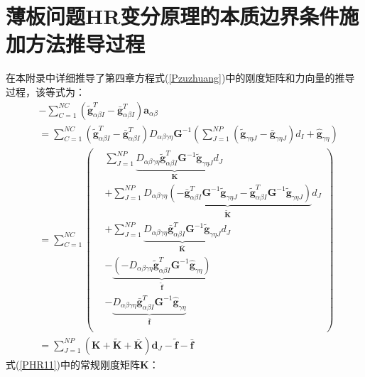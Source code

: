 \chapter{薄板问题HR变分原理的本质边界条件施加方法推导过程}\label{B}
在本附录中详细推导了第四章方程式(\ref{Pzuzhuang})中的刚度矩阵和力向量的推导过程，该等式为：
\begin{equation}
    \begin{split}
        &-\sum_{C=1}^{N\!C}(\tilde{\pmb g}_{\alpha\beta I}^T-\bar{\pmb g}_{\alpha\beta I}^T)\pmb a_{\alpha\beta}\\
        &=\sum_{C=1}^{N\!C}(\tilde{\pmb g}_{\alpha\beta I}^T-\bar{\pmb g}_{\alpha\beta I}^T)D_{\alpha\beta\gamma\eta}\pmb{G}^{-1}(\sum_{J=1}^{N\!P}(\tilde{\pmb g}_{\gamma\eta J}-\bar{\pmb g}_{\gamma\eta J})d_I+\hat{\pmb g}_{\gamma\eta})\\
        &=\sum_{C=1}^{N\!C}
        \left(\begin{split}
        &\sum_{J=1}^{N\!P}\underbrace{D_{\alpha\beta\gamma\eta}\tilde{\pmb g}_{\alpha\beta I}^T\pmb G^{-1}\tilde{\pmb g}_{\gamma\eta J}}_{\pmb{K}}d_J\\
        &+\sum_{J=1}^{N\!P}\underbrace{D_{\alpha\beta\gamma\eta}(-\bar{\pmb g}_{\alpha\beta I}^T\pmb G^{-1}\tilde{\pmb g}_{\gamma\eta J}-\tilde{\pmb g}_{\alpha\beta I}^T\pmb G^{-1}\tilde{\pmb g}_{\gamma\eta J})}_{\tilde{\pmb K}}d_J\\
        &+\sum_{J=1}^{N\!P}\underbrace{D_{\alpha\beta\gamma\eta}\bar{\pmb g}_{\alpha\beta I}^T\pmb G^{-1}\tilde{\pmb g}_{\gamma\eta J}}_{\bar{\pmb K}}d_J\\
        &-\underbrace{(-D_{\alpha\beta\gamma\eta}\tilde{\pmb g}_{\alpha\beta I}^T\pmb G^{-1}\hat{\pmb g}_{\gamma\eta })}_{\tilde{\pmb f}}\\
        &-\underbrace{D_{\alpha\beta\gamma\eta}\bar{\pmb g}_{\alpha\beta I}^T\pmb G^{-1}\hat{\pmb g}_{\gamma\eta }}_{\bar{\pmb f}}\\
        \end{split}\right)\\
        &=\sum_{J=1}^{N\!P}(\pmb{K}+\tilde{\pmb{K}}+\bar{\pmb{K}})\pmb d_J-\tilde{\pmb f}-\bar{\pmb f}
\end{split}
\end{equation}
\newpage
式(\ref{PHR11})中的常规刚度矩阵$\pmb{K}$：
